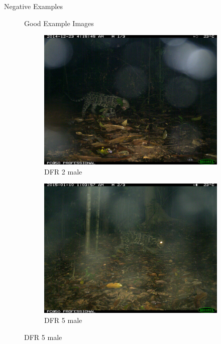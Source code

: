 \documentclass[10pt]{beamer}
\begin{document}
\begin{frame}{Negative Examples}
\begin{figure}
\begin{frame}{Good Example Images}		
	\centering
	\begin{minipage}[c]{0.48\linewidth}
		\begin{figure}
			\includegraphics[width=\linewidth,height=\textheight,keepaspectratio]{images/example_DFR_2_male.JPG}
			\caption{DFR 2 male}
		\end{figure}
	\end{minipage}
	\hfill
	\begin{minipage}[c]{0.48\linewidth}
		\begin{figure}
			\includegraphics[width=\linewidth,height=.8\textheight,keepaspectratio]{images/example_DFR_5_male.JPG}
			\caption{DFR 5 male}
		\end{figure}
	\end{minipage}
\end{frame}


\end{figure}
\end{frame}
\end{document}
